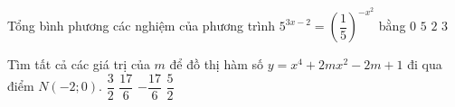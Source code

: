 \begin{ex}%
	Tổng bình phương các nghiệm của phương trình $5^{3x-2}=\left(\dfrac{1}{5}\right)^{-x^2}$ bằng
	\choice
	{$0$}
	{ \True $5$}
	{$2$}
	{$3$}
\end{ex}
\begin{ex}%
	Tìm tất cả các giá trị của $m$ để đồ thị hàm số $y=x^4+2mx^2-2m+1$ đi qua điểm $N\left(-2;0\right)$.
	\choice
	{$\dfrac{3}{2}$}
	{$\dfrac{17}{6}$}
	{ \True $-\dfrac{17}{6}$}
	{$\dfrac{5}{2}$}
\end{ex}
